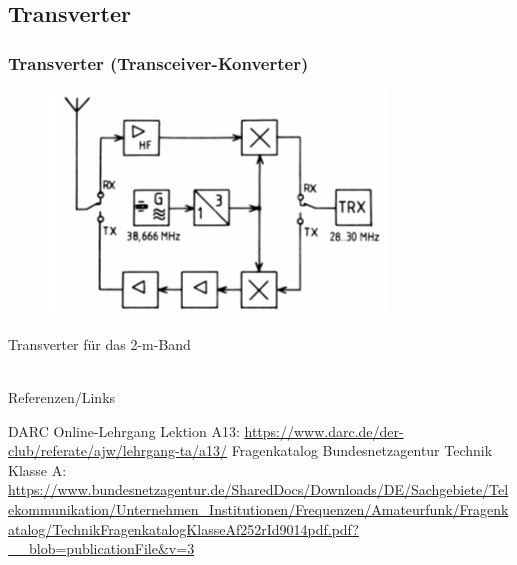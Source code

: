 \subsection{Transverter}

\begin{frame}
  \frametitle{Transverter (Transceiver-Konverter)}

  \begin{center}
    \begin{figure}
      \includegraphics[width=0.8\textwidth,height=.6\textheight,keepaspectratio]{a13/TF209.png}
    \end{figure}
  \end{center}

  Transverter für das 2-m-Band

\end{frame}

\renewcommand{\refname}{Referenzen}

\hypertarget{refs}{}
\textcolor{white}{} \\ %
\Large Referenzen/Links
\footnotesize

\begin{thebibliography}{}
    DARC Online-Lehrgang Lektion A13:
    \url{https://www.darc.de/der-club/referate/ajw/lehrgang-ta/a13/}
     Fragenkatalog Bundesnetzagentur Technik Klasse A:\\
    \url{https://www.bundesnetzagentur.de/SharedDocs/Downloads/DE/Sachgebiete/Telekommunikation/Unternehmen_Institutionen/Frequenzen/Amateurfunk/Fragenkatalog/TechnikFragenkatalogKlasseAf252rId9014pdf.pdf?__blob=publicationFile&v=3}
\end{thebibliography}


